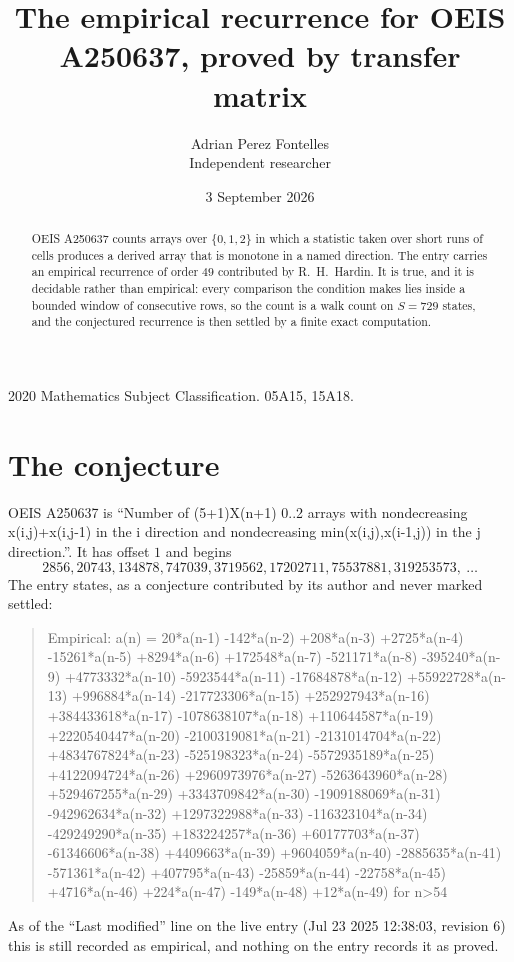 \documentclass[11pt,a4paper]{article}
\title{The empirical recurrence for OEIS A250637, proved by transfer matrix}
\author{Adrian Perez Fontelles\\ \small Independent researcher}
\date{3 September 2026}
\theoremstyle{plain}
\theoremstyle{definition}
\begin{document}
\maketitle

\begin{abstract}
OEIS A250637 counts arrays over $\{0,1,2\}$ in which a statistic taken over short runs
of cells produces a derived array that is monotone in a named direction. The entry carries an
empirical recurrence of order $49$ contributed by R.~H.~Hardin. It is true, and it is
decidable rather than empirical: every comparison the condition makes lies inside a bounded
window of consecutive rows, so the count is a walk count on $S=729$ states, and the
conjectured recurrence is then settled by a finite exact computation.
\end{abstract}

\noindent\small 2020 Mathematics Subject Classification. 05A15, 15A18.\normalsize

\section{The conjecture}

OEIS A250637 is ``Number of (5+1)X(n+1) 0..2 arrays with nondecreasing x(i,j)+x(i,j-1) in the i direction and nondecreasing min(x(i,j),x(i-1,j)) in the j direction.''. It has offset $1$ and begins
\[
2856, 20743, 134878, 747039, 3719562, 17202711, 75537881, 319253573,\ \dots
\]
The entry states, as a conjecture contributed by its author and never marked settled:
\begin{quote}
Empirical: a(n) = 20*a(n-1) -142*a(n-2) +208*a(n-3) +2725*a(n-4) -15261*a(n-5) +8294*a(n-6) +172548*a(n-7) -521171*a(n-8) -395240*a(n-9) +4773332*a(n-10) -5923544*a(n-11) -17684878*a(n-12) +55922728*a(n-13) +996884*a(n-14) -217723306*a(n-15) +252927943*a(n-16) +384433618*a(n-17) -1078638107*a(n-18) +110644587*a(n-19) +2220540447*a(n-20) -2100319081*a(n-21) -2131014704*a(n-22) +4834767824*a(n-23) -525198323*a(n-24) -5572935189*a(n-25) +4122094724*a(n-26) +2960973976*a(n-27) -5263643960*a(n-28) +529467255*a(n-29) +3343709842*a(n-30) -1909188069*a(n-31) -942962634*a(n-32) +1297322988*a(n-33) -116323104*a(n-34) -429249290*a(n-35) +183224257*a(n-36) +60177703*a(n-37) -61346606*a(n-38) +4409663*a(n-39) +9604059*a(n-40) -2885635*a(n-41) -571361*a(n-42) +407795*a(n-43) -25859*a(n-44) -22758*a(n-45) +4716*a(n-46) +224*a(n-47) -149*a(n-48) +12*a(n-49) for n>54
\end{quote}
As of the ``Last modified'' line on the live entry (Jul 23 2025 12:38:03, revision 6) this is still
recorded as empirical, and nothing on the entry records it as proved.
\end{document}
